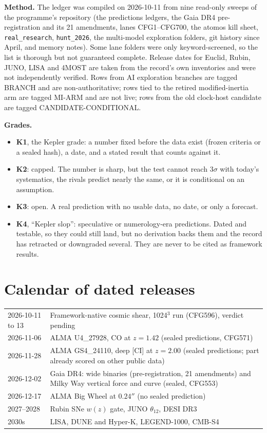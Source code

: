 \documentclass[10pt]{article}
\begin{document}
\textbf{Method.} The ledger was compiled on 2026-10-11 from nine read-only sweeps of the programme's repository (the predictions ledgers, the Gaia DR4 pre-registration and its 21 amendments, lanes CFG1--CFG700, the atomos kill sheet, \texttt{real\_research}, \texttt{hunt\_2026}, the multi-model exploration folders, git history since April, and memory notes). Some lane folders were only keyword-screened, so the list is thorough but not guaranteed complete. Release dates for Euclid, Rubin, JUNO, LISA and 4MOST are taken from the record's own inventories and were not independently verified. Rows from AI exploration branches are tagged BRANCH and are non-authoritative; rows tied to the retired modified-inertia arm are tagged MI-ARM and are not live; rows from the old clock-host candidate are tagged CANDIDATE-CONDITIONAL.

\textbf{Grades.} 

\begin{itemize}\item \textbf{K1}, the Kepler grade: a number fixed before the data exist (frozen criteria or a sealed hash), a date, and a stated result that counts against it.\item \textbf{K2}: capped. The number is sharp, but the test cannot reach $3\sigma$ with today's systematics, the rivals predict nearly the same, or it is conditional on an assumption.\item \textbf{K3}: open. A real prediction with no usable data, no date, or only a forecast.\item \textbf{K4}, ``Kepler slop'': speculative or numerology-era predictions. Dated and testable, so they could still land, but no derivation backs them and the record has retracted or downgraded several. They are never to be cited as framework results.\end{itemize}

\section{Calendar of dated releases}
\begin{center}\footnotesize\begin{tabular}{ll}
\toprule 2026-10-11 to 13 & Framework-native cosmic shear, 1024$^3$ run (CFG596), verdict pending\\
2026-11-06 & ALMA U4\_27928, CO at $z=1.42$ (sealed predictions, CFG571)\\
2026-11-28 & ALMA GS4\_24110, deep [CI] at $z=2.00$ (sealed predictions; part already scored on other public data)\\
2026-12-02 & Gaia DR4: wide binaries (pre-registration, 21 amendments) and Milky Way vertical force and curve (sealed, CFG553)\\
2026-12-17 & ALMA Big Wheel at $0.24''$ (no sealed prediction)\\
2027--2028 & Rubin SNe $w(z)$ gate, JUNO $\theta_{12}$, DESI DR3\\
2030s & LISA, DUNE and Hyper-K, LEGEND-1000, CMB-S4\\
\bottomrule\end{tabular}\end{center}
\end{document}
